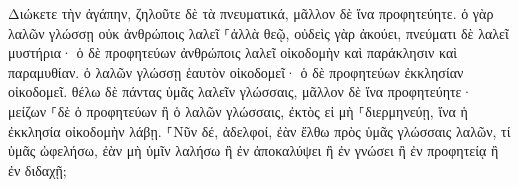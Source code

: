 \documentclass{openreader}
\begin{document}
Διώκετε τὴν ἀγάπην, ζηλοῦτε δὲ τὰ πνευματικά, μᾶλλον δὲ ἵνα προφητεύητε. 
ὁ γὰρ λαλῶν γλώσσῃ οὐκ ἀνθρώποις λαλεῖ ⸀ἀλλὰ θεῷ, οὐδεὶς γὰρ ἀκούει, πνεύματι δὲ λαλεῖ μυστήρια· 
ὁ δὲ προφητεύων ἀνθρώποις λαλεῖ οἰκοδομὴν καὶ παράκλησιν καὶ παραμυθίαν. 
ὁ λαλῶν γλώσσῃ ἑαυτὸν οἰκοδομεῖ· ὁ δὲ προφητεύων ἐκκλησίαν οἰκοδομεῖ. 
θέλω δὲ πάντας ὑμᾶς λαλεῖν γλώσσαις, μᾶλλον δὲ ἵνα προφητεύητε· μείζων ⸀δὲ ὁ προφητεύων ἢ ὁ λαλῶν γλώσσαις, ἐκτὸς εἰ μὴ ⸀διερμηνεύῃ, ἵνα ἡ ἐκκλησία οἰκοδομὴν λάβῃ. 
⸀Νῦν δέ, ἀδελφοί, ἐὰν ἔλθω πρὸς ὑμᾶς γλώσσαις λαλῶν, τί ὑμᾶς ὠφελήσω, ἐὰν μὴ ὑμῖν λαλήσω ἢ ἐν ἀποκαλύψει ἢ ἐν γνώσει ἢ ἐν προφητείᾳ ἢ ἐν διδαχῇ; 
\end{document}
